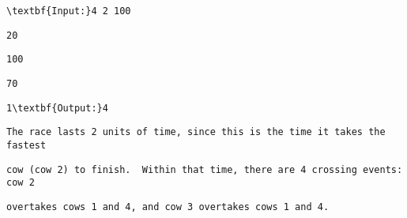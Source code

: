 \begin{verbatim}
\textbf{Input:}4 2 100 \end{verbatim}
\begin{verbatim}
20 \end{verbatim}
\begin{verbatim}
100 \end{verbatim}
\begin{verbatim}
70 \end{verbatim}
\begin{verbatim}
1\textbf{Output:}4\end{verbatim}
\begin{verbatim}
The race lasts 2 units of time, since this is the time it takes the fastest \end{verbatim}
\begin{verbatim}
cow (cow 2) to finish.  Within that time, there are 4 crossing events: cow 2 \end{verbatim}
\begin{verbatim}
overtakes cows 1 and 4, and cow 3 overtakes cows 1 and 4.\end{verbatim}
